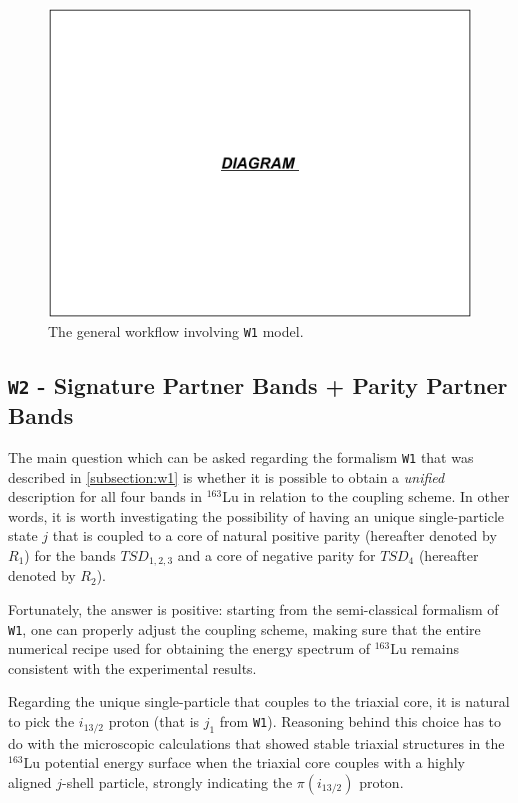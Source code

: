 \documentclass[11pt]{article}
\begin{document}
\begin{figure}
    \centering
    \includegraphics[scale=0.65]{figs/W1_W2_models.pdf}
    \caption{The general workflow involving \texttt{W1} model.}
    \label{w1-model-worfklow}
\end{figure}

\subsection{\texttt{W2} - Signature Partner Bands + Parity Partner Bands}
\label{subsection:w2}

The main question which can be asked regarding the formalism \texttt{W1} that was described in \ref{subsection:w1} is whether it is possible to obtain a \emph{unified} description for all four bands in $^{163}$Lu in relation to the coupling scheme. In other words, it is worth investigating the possibility of having an unique single-particle state $j$ that is coupled to a core of natural positive parity (hereafter denoted by $R_1$) for the bands $TSD_{1,2,3}$ and a core of negative parity for $TSD_4$ (hereafter denoted by $R_2$).

Fortunately, the answer is positive: starting from the semi-classical formalism of \texttt{W1}, one can properly adjust the coupling scheme, making sure that the entire numerical recipe used for obtaining the energy spectrum of $^{163}$Lu remains consistent with the experimental results.

Regarding the unique single-particle that couples to the triaxial core, it is natural to pick the $i_{13/2}$ proton (that is $j_1$ from \texttt{W1}). Reasoning behind this choice has to do with the microscopic calculations \cite{jensen2002wobbling,hagemann2003quantized,jensen2004coexisting} that showed stable triaxial structures in the $^{163}$Lu potential energy surface when the triaxial core couples with a highly aligned $j$-shell particle, strongly indicating the $\pi(i_{13/2})$ proton.
\end{document}
